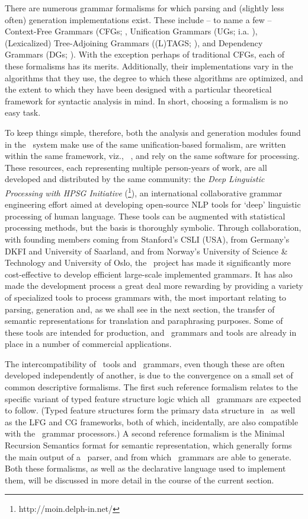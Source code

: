 There are numerous grammar formalisms for which parsing and (slightly less
often) generation implementations exist. These include -- to name a few --
Context-Free Grammars (CFGs; \citet{chomsky1959certain}, Unification Grammars
(UGs; i.a. \citet{shieber1983formalism}), (Lexicalized) Tree-Adjoining Grammars
((L)TAGS; \citet{joshi1997tree}), and Dependency Grammars (DGs;
\citet{vater1975toward}). With the exception perhaps of traditional CFGs, each
of these formalisms has its merits. Additionally, their implementations vary in
the algorithms that they use, the degree to which these algorithms are
optimized, and the extent to which they have been designed with a
particular theoretical framework for syntactic analysis in mind. In short,
choosing a formalism is no easy task.

To keep things simple, therefore, both the analysis and generation modules
found in the \depicto\ system make use of the same unification-based formalism,
are written within the same framework, viz., \hpsg\ \citep{pollard1994head},
and rely on the same software for processing. These resources, each
representing multiple person-years of work, are all developed and distributed
by the same community: the \emph{Deep Linguistic Processing with HPSG
Initiative} (\delphin \footnote{http://moin.delph-in.net/}), an international
collaborative grammar engineering effort aimed at developing open-source NLP
tools for `deep' linguistic processing of human language. These tools can be
augmented with statistical processing methods, but the basis is thoroughly
symbolic. Through collaboration, with founding members coming from Stanford's
CSLI (USA), from Germany's DKFI and University of Saarland, and from Norway's
University of Science \& Technology and University of Oslo, the \delphin\
project has made it significantly more cost-effective to develop efficient
large-scale implemented grammars. It has also made the development process a
great deal more rewarding by providing a variety of specialized tools to
process grammars with, the most important relating to parsing, generation and,
as we shall see in the next section, the transfer of semantic representations
for translation and paraphrasing purposes. Some of these tools are intended for
production, and \delphin\ grammars and tools are already in place in a number
of commercial applications.

The intercompatibility of \delphin\ tools and \delphin\ grammars, even though
these are often developed independently of another, is due to the convergence
on a small set of common descriptive formalisms. The first such reference
formalism relates to the specific variant of typed feature structure logic
which all \delphin\ grammars are expected to follow. (Typed feature structures
form the primary data structure in \hpsg\ as well as the LFG and CG frameworks,
both of which, incidentally, are also compatible with the \delphin\ grammar
processors.) A second reference formalism is the Minimal Recursion Semantics
format for semantic representation, which generally forms the main output of a
\delphin\ parser, and from which \delphin\ grammars are able to generate. Both
these formalisms, as well as the declarative language used to implement them,
will be discussed in more detail in the course of the current section.

